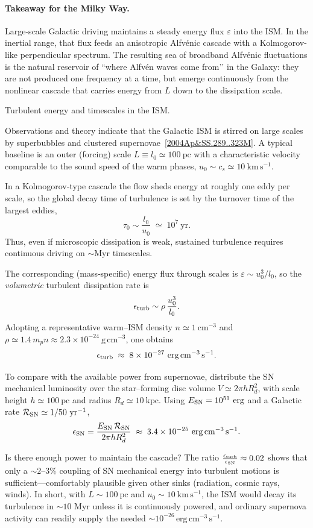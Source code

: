 \paragraph{Takeaway for the Milky Way.}
Large-scale Galactic driving maintains a steady energy flux \(\varepsilon\) into the ISM. In the inertial range, that flux feeds an anisotropic Alfvénic cascade with a Kolmogorov-like perpendicular spectrum. The resulting sea of broadband Alfvénic fluctuations is the natural reservoir of ``where Alfvén waves come from’’ in the Galaxy: they are not produced one frequency at a time, but emerge continuously from the nonlinear cascade that carries energy from \(L\) down to the dissipation scale.

\begin{remark}{Turbulent energy and timescales in the ISM.}

Observations and theory indicate that the Galactic ISM is stirred on large scales by superbubbles and clustered supernovae~\ref{2004Ap&SS.289..323M}. A typical baseline is an outer (forcing) scale \(L\equiv l_0\simeq 100~\mathrm{pc}\) with a characteristic velocity comparable to the sound speed of the warm phases,
\(u_0\sim c_s\simeq 10~\mathrm{km\,s^{-1}}\).

In a Kolmogorov‐type cascade the flow sheds energy at roughly one eddy per scale, so the global decay time of turbulence is set by the turnover time of the largest eddies,
\[
\tau_0 \sim \frac{l_0}{u_0}
\;\simeq\; 10^{7}~\mathrm{yr}.
\]
Thus, even if microscopic dissipation is weak, sustained turbulence requires continuous driving on $\sim$Myr timescales.

The corresponding (mass‐specific) energy flux through scales is
\(\varepsilon \sim u_0^{3}/l_0\),
so the \emph{volumetric} turbulent dissipation rate is
\[
\epsilon_{\rm turb} \sim \rho\,\frac{u_0^{3}}{l_0}.
\]
Adopting a representative warm–ISM density \(n\simeq 1~\mathrm{cm^{-3}}\) and
\(\rho\simeq 1.4\,m_p n \approx 2.3\times10^{-24}~\mathrm{g\,cm^{-3}}\),
one obtains
\[
\epsilon_{\rm turb}\;\approx\; 8\times10^{-27}\ \mathrm{erg\,cm^{-3}\,s^{-1}}.
\]

To compare with the available power from supernovae, distribute the SN mechanical luminosity over the star–forming disc volume
\(V\simeq 2\pi h R_d^2\),
with scale height \(h\simeq 100~\mathrm{pc}\) and radius \(R_d\simeq 10~\mathrm{kpc}\).
Using \(E_{\rm SN}=10^{51}~\mathrm{erg}\) and a Galactic rate
\(\mathcal R_{\rm SN}\simeq 1/50~\mathrm{yr^{-1}}\),
\[
\epsilon_{\rm SN}
=\frac{E_{\rm SN}\,\mathcal R_{\rm SN}}{2\pi h R_d^2}
\;\approx\;
3.4\times10^{-25}\ \mathrm{erg\,cm^{-3}\,s^{-1}}.
\]

Is there enough power to maintain the cascade?
The ratio
\(
\tfrac{\epsilon_{\rm turb}}{\epsilon_{\rm SN}} \approx 0.02
\)
shows that only a \(\sim\!2\text{–}3\%\) coupling of SN mechanical energy into turbulent motions is sufficient—comfortably plausible given other sinks (radiation, cosmic rays, winds). In short, with \(L\sim100\ \mathrm{pc}\) and \(u_0\sim10\ \mathrm{km\,s^{-1}}\), the ISM would decay its turbulence in \(\sim10\) Myr unless it is continuously powered, and ordinary supernova activity can readily supply the needed \(\sim10^{-26} \, \mathrm{erg\,cm^{-3}\,s^{-1}}\).
\end{remark}
